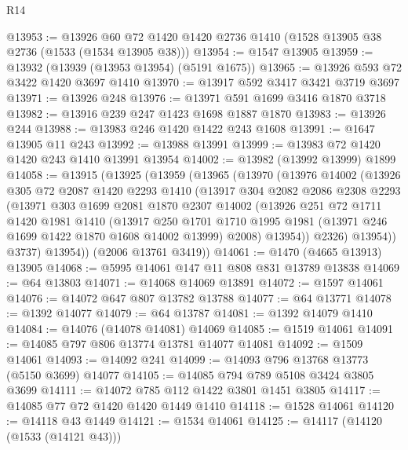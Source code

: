 \begin{lexlean}{R14}
\begin{coremodule}
@13953 := @13926 @60 @72 @1420 @1420 @2736 @1410 (@1528 @13905 @38 @2736 (@1533 (@1534 @13905 @38)))
@13954 := @1547 @13905
@13959 := @13932 (@13939 (@13953 @13954) (@5191 @1675))
@13965 := @13926 @593 @72 @3422 @1420 @3697 @1410
@13970 := @13917 @592 @3417 @3421 @3719 @3697
@13971 := @13926 @248
@13976 := @13971 @591 @1699 @3416 @1870 @3718
@13982 := @13916 @239 @247 @1423 @1698 @1887 @1870
@13983 := @13926 @244
@13988 := @13983 @246 @1420 @1422 @243 @1608
@13991 := @1647 @13905 @11 @243
@13992 := @13988 @13991
@13999 := @13983 @72 @1420 @1420 @243 @1410 @13991 @13954
@14002 := @13982 (@13992 @13999) @1899
@14058 := @13915
    (@13925
      (@13959
        (@13965
          (@13970
            (@13976
              @14002
              (@13926
                @305
                @72
                @2087
                @1420
                @2293
                @1410
                (@13917
                  @304
                  @2082
                  @2086
                  @2308
                  @2293
                  (@13971
                    @303
                    @1699
                    @2081
                    @1870
                    @2307
                    @14002
                    (@13926
                      @251
                      @72
                      @1711
                      @1420
                      @1981
                      @1410
                      (@13917
                        @250
                        @1701
                        @1710
                        @1995
                        @1981
                        (@13971 @246 @1699 @1422 @1870 @1608 @14002 @13999)
                        @2008)
                      @13954))
                  @2326)
                @13954))
            @3737)
          @13954))
      (@2006 @13761 @3419))
@14061 := @1470 (@4665 @13913) @13905
@14068 := @5995 @14061 @147 @11 @808 @831 @13789 @13838
@14069 := @64 @13803
@14071 := @14068 @14069 @13891
@14072 := @1597 @14061
@14076 := @14072 @647 @807 @13782 @13788
@14077 := @64 @13771
@14078 := @1392 @14077
@14079 := @64 @13787
@14081 := @1392 @14079 @1410
@14084 := @14076 (@14078 @14081) @14069
@14085 := @1519 @14061
@14091 := @14085 @797 @806 @13774 @13781 @14077 @14081
@14092 := @1509 @14061
@14093 := @14092 @241
@14099 := @14093 @796 @13768 @13773 (@5150 @3699) @14077
@14105 := @14085 @794 @789 @5108 @3424 @3805 @3699
@14111 := @14072 @785 @112 @1422 @3801 @1451 @3805
@14117 := @14085 @77 @72 @1420 @1420 @1449 @1410
@14118 := @1528 @14061
@14120 := @14118 @43 @1449
@14121 := @1534 @14061
@14125 := @14117 (@14120 (@1533 (@14121 @43)))

\end{coremodule}
\end{lexlean}
